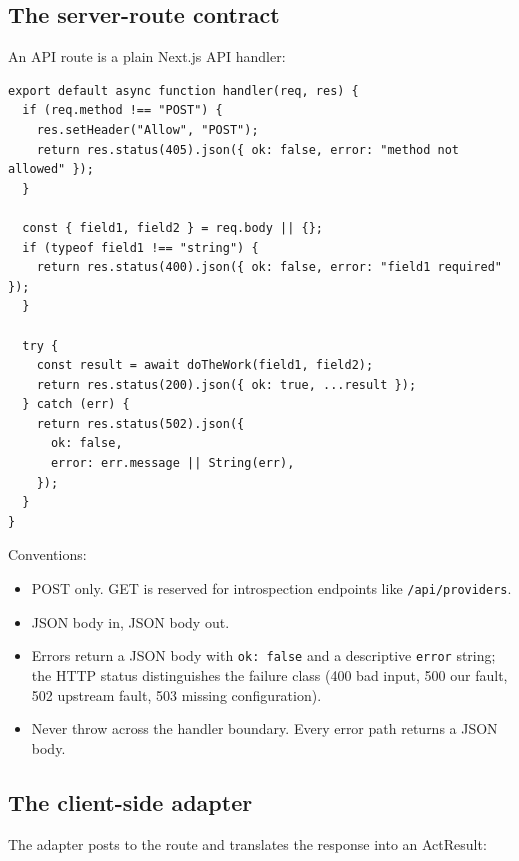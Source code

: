 \documentclass[11pt,a4paper]{article}
\theoremstyle{contract}
\begin{document}
\subsection{The server-route contract}

An API route is a plain Next.js API handler:

\begin{lstlisting}
export default async function handler(req, res) {
  if (req.method !== "POST") {
    res.setHeader("Allow", "POST");
    return res.status(405).json({ ok: false, error: "method not allowed" });
  }

  const { field1, field2 } = req.body || {};
  if (typeof field1 !== "string") {
    return res.status(400).json({ ok: false, error: "field1 required" });
  }

  try {
    const result = await doTheWork(field1, field2);
    return res.status(200).json({ ok: true, ...result });
  } catch (err) {
    return res.status(502).json({
      ok: false,
      error: err.message || String(err),
    });
  }
}
\end{lstlisting}

Conventions:

\begin{itemize}[nosep,leftmargin=1.4em]
\item POST only. GET is reserved for introspection endpoints like
\texttt{/api/providers}.
\item JSON body in, JSON body out.
\item Errors return a JSON body with \texttt{ok: false} and a
descriptive \texttt{error} string; the HTTP status distinguishes the
failure class (400 bad input, 500 our fault, 502 upstream fault, 503
missing configuration).
\item Never throw across the handler boundary. Every error path returns
a JSON body.
\end{itemize}

\subsection{The client-side adapter}

The adapter posts to the route and translates the response into an
ActResult:
\end{document}
